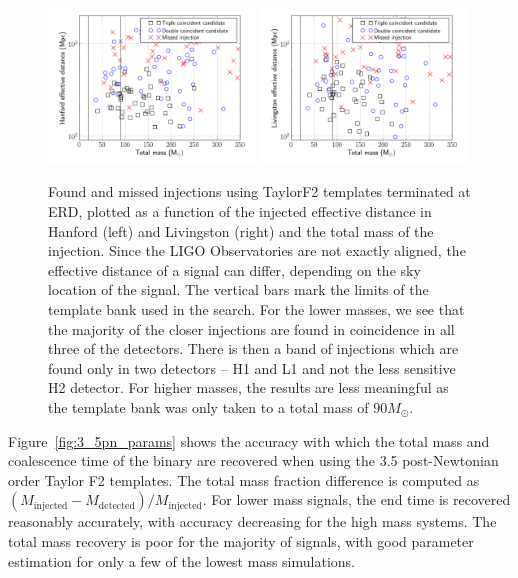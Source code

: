 \begin{figure}
\begin{center}
  \includegraphics[width=0.49\textwidth]{figures/ninja1/spa_erd_3_5pn_found_missed_mchirp}
  \includegraphics[width=0.49\textwidth]{figures/ninja1/spa_erd_3_5pn_found_missed_mchirp_l}
\end{center}
\caption[NINJA-1 injections found/missed by an inspiral search with
$f_c=$ ERD.]{
\label{fig:3_5pn_found_missed}
Found and missed injections using TaylorF2 templates
terminated at ERD, plotted as a function of the injected effective
distance in Hanford (left) and Livingston (right) and the total mass
of the injection. Since the LIGO Observatories are not exactly
aligned, the effective distance of a signal can differ, depending on
the sky location of the signal.  The vertical bars mark the limits of
the template bank used in the search.  For the lower masses, we see
that the majority of the closer injections are found in coincidence in
all three of the detectors.  There is then a band of injections which
are found only in two detectors -- H1 and L1 and not the less
sensitive H2 detector.  For higher masses, the results are less
meaningful as the template bank was only taken to a total mass of $90
M_{\odot}$.}
\end{figure}

Figure~\ref{fig:3_5pn_params} shows the accuracy with which the total mass and
coalescence time of the binary are recovered when using the 3.5 post-Newtonian
order Taylor F2 templates. The total mass fraction difference is computed as
$(M_\mathrm{injected} - M_\mathrm{detected})/ M_\mathrm{injected}$. For lower
mass signals, the end time is recovered reasonably accurately, with accuracy
decreasing for the high mass systems. The total mass recovery is poor for the
majority of signals, with good parameter estimation for only a few of the
lowest mass simulations.

